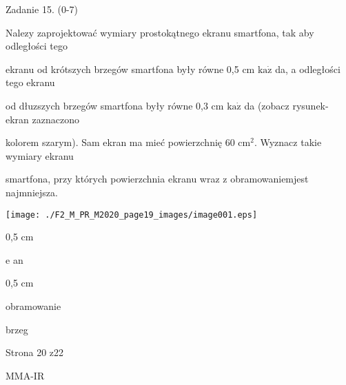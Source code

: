 \documentclass[a4paper,12pt]{article}
\begin{document}
Zadanie 15. (0-7)

Nalez$\mathrm{y}$ zaprojektować wymiary prostokątnego ekranu smartfona, tak aby odległości tego

ekranu od krótszych brzegów smartfona były równe 0,5 cm $\mathrm{k}\mathrm{a}\dot{\mathrm{z}}$ da, a odległości tego ekranu

od dłuzszych brzegów smartfona były równe 0,3 cm $\mathrm{k}\mathrm{a}\dot{\mathrm{z}}$ da (zobacz rysunek- ekran zaznaczono

kolorem szarym). Sam ekran ma mieć powierzchnię 60 $\mathrm{c}\mathrm{m}^{2}$. Wyznacz takie wymiary ekranu

smartfona, przy których powierzchnia ekranu wraz z obramowaniemjest najmniejsza.
\begin{center}
\texttt{[image: ./F2\_M\_PR\_M2020\_page19\_images/image001.eps]}
\end{center}
0,5 cm

e an

0,5 cm

obramowanie

brzeg

Strona 20 z22

MMA-IR
\end{document}
